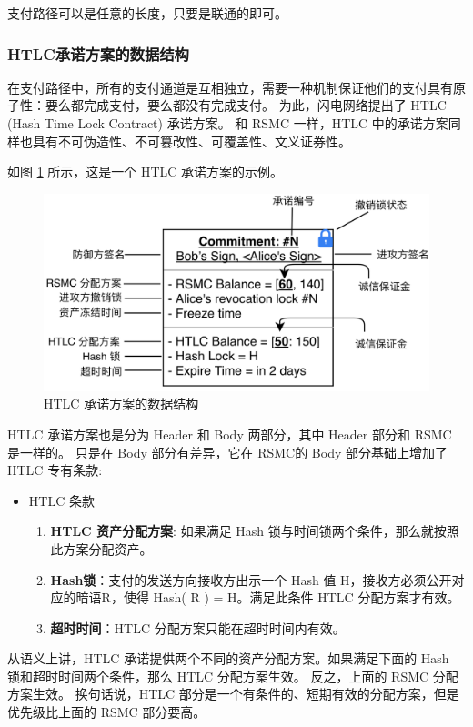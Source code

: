支付路径可以是任意的长度，只要是联通的即可。

\subsubsection{HTLC承诺方案的数据结构}
在支付路径中，所有的支付通道是互相独立，需要一种机制保证他们的支付具有原子性：要么都完成支付，要么都没有完成支付。
为此，闪电网络提出了 HTLC (Hash Time Lock Contract) 承诺方案。
和 RSMC 一样，HTLC 中的承诺方案同样也具有不可伪造性、不可篡改性、可覆盖性、文义证券性。

如图 \ref{fig:htlc} 所示，这是一个 HTLC 承诺方案的示例。

\begin{figure}[h!]
    \centering
    \includegraphics[width=12cm, keepaspectratio]{../images/HTLC.png}
    \caption{HTLC 承诺方案的数据结构}
    \label{fig:htlc}
\end{figure}

HTLC 承诺方案也是分为 Header 和 Body 两部分，其中 Header 部分和 RSMC 是一样的。
只是在 Body 部分有差异，它在 RSMC的 Body 部分基础上增加了 HTLC 专有条款:
\begin{itemize}
    \item HTLC 条款
        \begin{enumerate}
            \item \textbf{HTLC 资产分配方案}: 如果满足 Hash 锁与时间锁两个条件，那么就按照此方案分配资产。
            \item \textbf{Hash锁}：支付的发送方向接收方出示一个 Hash 值 H，接收方必须公开对应的暗语R，使得 Hash( R ) = H。满足此条件 HTLC 分配方案才有效。
            \item \textbf{超时时间}：HTLC 分配方案只能在超时时间内有效。
        \end{enumerate}
\end{itemize}

从语义上讲，HTLC 承诺提供两个不同的资产分配方案。如果满足下面的 Hash 锁和超时时间两个条件，那么 HTLC 分配方案生效。
反之，上面的 RSMC 分配方案生效。
换句话说，HTLC 部分是一个有条件的、短期有效的分配方案，但是优先级比上面的 RSMC 部分要高。


